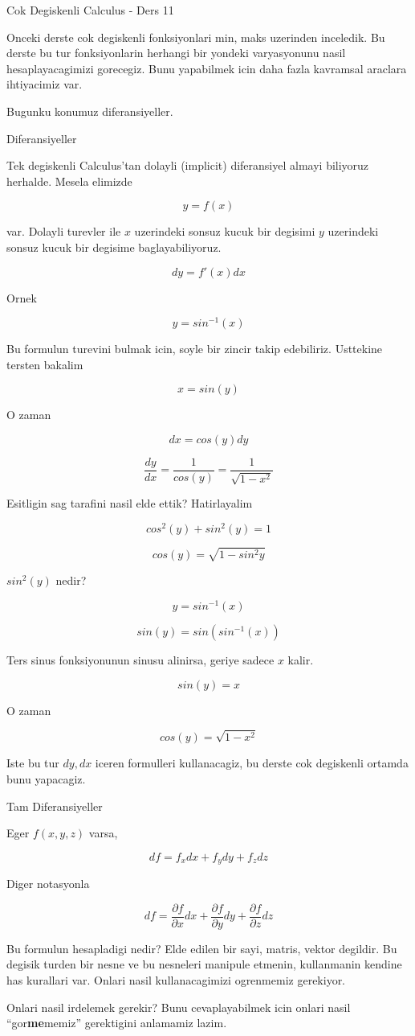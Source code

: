 \documentclass[12pt,fleqn]{article}
\begin{document}
Cok Degiskenli Calculus - Ders 11

Onceki derste cok degiskenli fonksiyonlari min, maks uzerinden
inceledik. Bu derste bu tur fonksiyonlarin herhangi bir yondeki
varyasyonunu nasil hesaplayacagimizi gorecegiz. Bunu yapabilmek icin daha
fazla kavramsal araclara ihtiyacimiz var. 

Bugunku konumuz diferansiyeller. 

Diferansiyeller

Tek degiskenli Calculus'tan dolayli (implicit) diferansiyel almayi
biliyoruz herhalde. Mesela elimizde

\[ y = f(x) \]

var. Dolayli turevler ile $x$ uzerindeki sonsuz kucuk bir degisimi $y$
uzerindeki sonsuz kucuk bir degisime baglayabiliyoruz. 

\[ dy = f'(x) dx \]

Ornek

\[ y = sin^{-1}(x) \]

Bu formulun turevini bulmak icin, soyle bir zincir takip
edebiliriz. Usttekine tersten bakalim

\[ x = sin(y) \]

O zaman

\[ dx = cos(y)dy \]

\[ 
\frac{dy}{dx} = \frac{1}{cos(y)} = \frac{1}{\sqrt{1-x^2}}
 \]

Esitligin sag tarafini nasil elde ettik? Hatirlayalim

\[ cos^2(y) + sin^2(y) = 1 \]

\[ cos (y) = \sqrt{1 - sin^2y} \]

$sin^2(y)$ nedir? 

\[ y = sin^{-1}(x) \]

\[ sin(y) = sin(sin^{-1}(x)) \]

Ters sinus fonksiyonunun sinusu alinirsa, geriye sadece $x$ kalir. 

\[ sin(y) = x \]

O zaman

\[ cos (y) = \sqrt{1 - x^2} \]

Iste bu tur $dy,dx$ iceren formulleri kullanacagiz, bu derste cok
degiskenli ortamda bunu yapacagiz. 

Tam Diferansiyeller

Eger $f(x,y,z)$ varsa, 

\[ df = f_xdx + f_ydy + f_zdz \]

Diger notasyonla

\[ df = \frac{\partial f}{\partial x}dx + \frac{\partial f}{\partial y}dy + 
\frac{\partial f}{\partial z}dz \]

Bu formulun hesapladigi nedir? Elde edilen bir sayi, matris, vektor
degildir. Bu degisik turden bir nesne ve bu nesneleri manipule etmenin,
kullanmanin kendine has kurallari var. Onlari nasil kullanacagimizi
ogrenmemiz gerekiyor. 

Onlari nasil irdelemek gerekir? Bunu cevaplayabilmek icin onlari nasil
``gor\textbf{me}memiz'' gerektigini anlamamiz lazim. 
\end{document}
